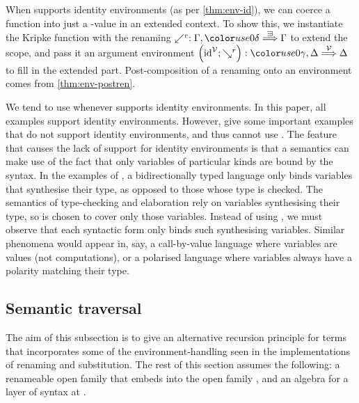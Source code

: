When \AgdaBound{$\V$} supports identity environments (as per \cref{thm:env-id}),
we can coerce a  function into just a
\AgdaBound{$\C$}-value in an extended context.
To show this, we instantiate the Kripke function with the renaming
$\swarrow^r : \Gamma, \gr0\delta \env\sqni \Gamma$ to extend the scope, and
pass it an argument environment
$\plr{\id^\V; \searrow^r} : \gr0\gamma, \Delta \env\V \Delta$ to fill in the
extended part.
Post-composition of a renaming onto an environment comes from
\cref{thm:env-postren}.


We tend to use  whenever \AgdaBound{$\V$} supports
identity environments.
In this paper, all examples support identity environments.
However, \citet[p.~27]{AACMM20} give some important examples that do not
support identity environments, and thus cannot use .
The feature that causes the lack of support for identity environments is that
a semantics can make use of the fact that only variables of particular kinds
are bound by the syntax.
In the examples of \citeauthor{AACMM20}, a bidirectionally typed language only
binds variables that synthesise their type, as opposed to those whose type is
checked.
The semantics of type-checking and elaboration rely on variables synthesising
their type, so \AgdaBound{$\V$} is chosen to cover only those variables.
Instead of using , we must observe that each syntactic form
only binds such synthesising variables.
Similar phenomena would appear in, say, a call-by-value language where
variables are values (not computations), or a polarised language where
variables always have a polarity matching their type.

\subsection{Semantic traversal}

The aim of this subsection is to give an alternative recursion principle for
terms that incorporates some of the environment-handling seen in the
implementations of renaming and substitution.
The rest of this section assumes the following: a renameable open family
\AgdaBound{$\V$} that embeds into the open family \AgdaBound{$\C$}, and an
algebra for a layer of syntax at \AgdaBound{$\C$}.



